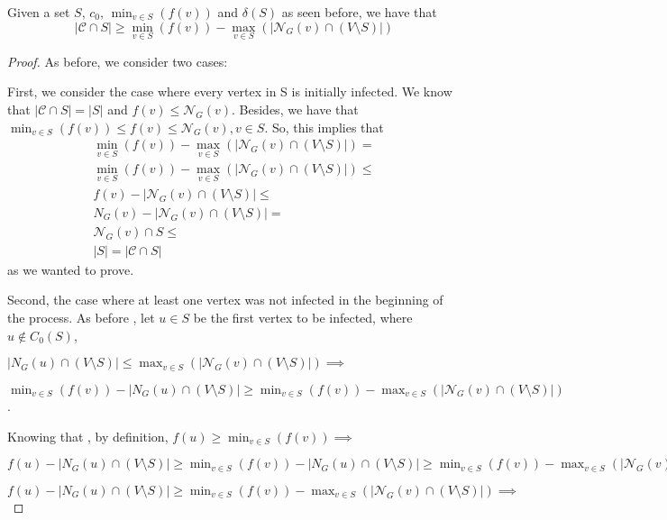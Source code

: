 \begin{myprop}
Given a set $S$,  $c_0$,  $\min_{v \in S} (f(v))$ and $\delta(S)$ as seen before, we have that 
\begin{equation}
|\mathcal{C} \cap S | \geq \min_{v \in S} (f(v)) - \max_{v \in S} (|\mathcal{N}_G(v) \cap (V \setminus S)|)
\end{equation}
\end{myprop}
\begin{proof}
As before, we consider two cases: 

First, we consider the case where every vertex in S is initially infected. We know that $|\mathcal{C} \cap S | = |S|$ and  $f(v) \leq \mathcal{N}_G(v) $.  Besides, we have that $\min_{v \in S} (f(v)) \leq f(v) \leq \mathcal{N}_G(v), v \in S$.  So, this implies that
\begin{gather}
\min_{v \in S} (f(v)) - \max_{v \in S} (|\mathcal{N}_G(v) \cap (V \setminus S)|) =\\
\min_{v \in S} (f(v))  - \max_{v \in S} (|\mathcal{N}_G(v) \cap (V \setminus S)|) \leq \\
f(v) - |\mathcal{N}_G(v) \cap (V \setminus S)| \leq \\ 
{N}_G(v)  - |\mathcal{N}_G(v) \cap (V \setminus S)| = \\ 
\mathcal{N}_G(v) \cap S  \leq\\  |S| = |\mathcal{C} \cap S | 
\end{gather}
as we wanted to prove.

Second, the case where at least one vertex was not infected in the beginning of the process. 
As before %
, let $u \in S$ be the first vertex to be infected, where $u \notin C_0(S)$,    

$|{N}_G(u) \cap (V \setminus S)| \leq \max_{v \in S} (|\mathcal{N}_G(v) \cap (V \setminus S)|) \implies$ 

$\min_{v \in S} (f(v)) - |{N}_G(u) \cap (V \setminus S)| \geq \min_{v \in S} (f(v)) - \max_{v \in S} (|\mathcal{N}_G(v) \cap (V \setminus S)|) $.

Knowing that , by definition,  $f(u) \geq \min_{v \in S} (f(v))  \implies $ 

$f(u) - |{N}_G(u) \cap (V \setminus S)| \geq \min_{v \in S} (f(v)) - |{N}_G(u) \cap (V \setminus S)| \geq \min_{v \in S} (f(v)) - \max_{v \in S} (|\mathcal{N}_G(v) \cap (V \setminus S)|)  \implies$

$f(u) - |{N}_G(u) \cap (V \setminus S)|  \geq \min_{v \in S} (f(v)) - \max_{v \in S} (|\mathcal{N}_G(v) \cap (V \setminus S)|)  \implies$


\end{proof}
